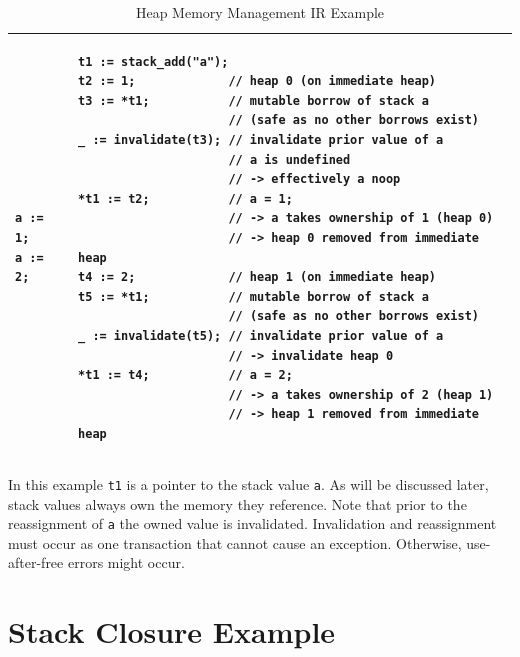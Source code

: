 \begin{table}[H]
	\centering
	\renewcommand{\arraystretch}{1}
	\begin{tabular}{ |p{4cm}|p{10cm}| }
		\hline
\begin{lstlisting}
a := 1;
a := 2;
\end{lstlisting}
&
\begin{lstlisting}
t1 := stack_add("a");
t2 := 1;             // heap 0 (on immediate heap)
t3 := *t1;           // mutable borrow of stack a
                     // (safe as no other borrows exist)
_ := invalidate(t3); // invalidate prior value of a
                     // a is undefined
                     // -> effectively a noop
*t1 := t2;           // a = 1;
                     // -> a takes ownership of 1 (heap 0)
                     // -> heap 0 removed from immediate heap
t4 := 2;             // heap 1 (on immediate heap)
t5 := *t1;           // mutable borrow of stack a
                     // (safe as no other borrows exist)
_ := invalidate(t5); // invalidate prior value of a
                     // -> invalidate heap 0
*t1 := t4;           // a = 2;
                     // -> a takes ownership of 2 (heap 1)
                     // -> heap 1 removed from immediate heap
\end{lstlisting}
\\
		\hline
	\end{tabular}
    \caption{Heap Memory Management \ac{IR} Example}
\end{table}

In this example \texttt{t1} is a pointer to the stack value \texttt{a}. As will be discussed later, stack values always own the memory they reference. Note that prior to the reassignment of \texttt{a} the owned value is invalidated. Invalidation and reassignment must occur as one transaction that cannot cause an exception. Otherwise, use-after-free errors might occur.

\section{Stack Closure Example}
\label{sec:stack-closure}

